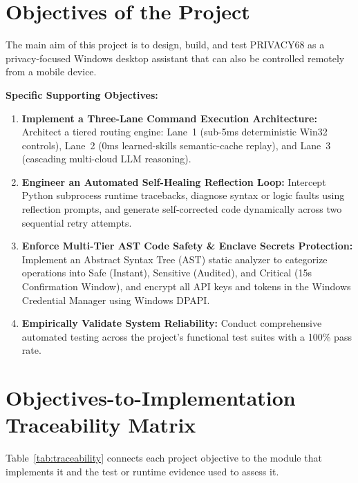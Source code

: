 \documentclass[12pt,letterpaper,oneside]{report}
\begin{document}
\section{Objectives of the Project}
The main aim of this project is to design, build, and test PRIVACY68 as a privacy-focused Windows desktop assistant that can also be controlled remotely from a mobile device.

\noindent\textbf{Specific Supporting Objectives:}
\begin{enumerate}
    \item \textbf{Implement a Three-Lane Command Execution Architecture:} Architect a tiered routing engine: Lane~1 (sub-5ms deterministic Win32 controls), Lane~2 (0ms learned-skills semantic-cache replay), and Lane~3 (cascading multi-cloud LLM reasoning).
    \item \textbf{Engineer an Automated Self-Healing Reflection Loop:} Intercept Python subprocess runtime tracebacks, diagnose syntax or logic faults using reflection prompts, and generate self-corrected code dynamically across two sequential retry attempts.
    \item \textbf{Enforce Multi-Tier AST Code Safety \& Enclave Secrets Protection:} Implement an Abstract Syntax Tree (AST) static analyzer to categorize operations into Safe (Instant), Sensitive (Audited), and Critical (15s Confirmation Window), and encrypt all API keys and tokens in the Windows Credential Manager using Windows DPAPI.
    \item \textbf{Empirically Validate System Reliability:} Conduct comprehensive automated testing across the project's functional test suites with a 100\% pass rate.
\end{enumerate}

\section{Objectives-to-Implementation Traceability Matrix}
Table~\ref{tab:traceability} connects each project objective to the module that implements it and the test or runtime evidence used to assess it.
\end{document}
